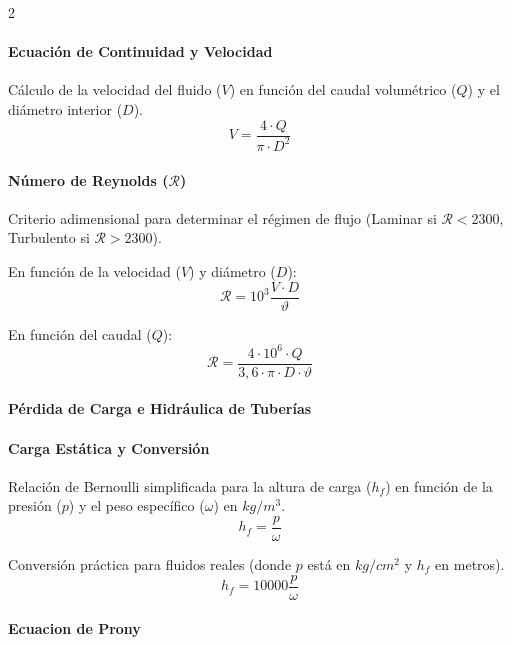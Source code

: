 \documentclass[11pt]{article}
\begin{document}
\begin{multicols*}{2}
    \paragraph*{Ecuación de Continuidad y Velocidad}
    Cálculo de la velocidad del fluido ($V$) en función del caudal volumétrico ($Q$) y el diámetro interior ($D$).
    \begin{equation}
        V = \frac{4 \cdot Q}{\pi \cdot D^2}
    \end{equation}
    
    
    \paragraph*{Número de Reynolds ($\mathcal{R}$)}
    Criterio adimensional para determinar el régimen de flujo (Laminar si $\mathcal{R} < 2300$, Turbulento si $\mathcal{R} > 2300$).
    
    En función de la velocidad ($V$) y diámetro ($D$):
    \begin{equation}
        \mathcal{R} = 10^3 \frac{V \cdot D}{\vartheta}
    \end{equation}
    
    En función del caudal ($Q$):
    \begin{equation}
        \mathcal{R} = \frac{4 \cdot 10^6 \cdot Q}{3,6 \cdot \pi \cdot D \cdot \vartheta}
    \end{equation}
    
    \paragraph*{Pérdida de Carga e Hidráulica de Tuberías}
    
    \paragraph*{Carga Estática y Conversión}
    Relación de Bernoulli simplificada para la altura de carga ($h_f$) en función de la presión ($p$) y el peso específico ($\omega$) en $kg/m^3$.
    \begin{equation}
        h_f = \frac{p}{\omega}
    \end{equation}
    
    Conversión práctica para fluidos reales (donde $p$ está en $kg/cm^2$ y $h_f$ en metros).
    \begin{equation}
        h_f = 10000 \frac{p}{\omega}
    \end{equation}

    \paragraph*{Ecuacion de Prony}


\end{multicols*}
\end{document}
